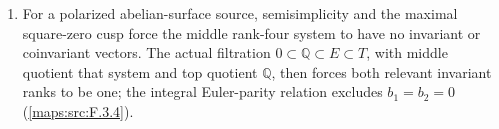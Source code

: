 \begin{enumerate}[label=\arabic*.]
  singular-value bound put a spanning tube in the unpolarized period
  domain.  The verified local-spray approximation theorem, with the
  relative extension-point argument proved here, produces a
  holomorphic transverse period section and retains any prescribed
  bounded cusp jet (\cref{maps:src:F.3.8}, \cref{maps:src:F.3.10}, \cref{maps:src:F.3.11}).
\item For a polarized abelian-surface source, semisimplicity and the
  maximal square-zero cusp force the middle rank-four system to have
  no invariant or coinvariant vectors.  The actual filtration
  $0\subset\mathbb Q\subset E\subset T$, with middle quotient that
  system and top quotient $\mathbb Q$, then forces both relevant
  invariant ranks to be one; the integral Euler-parity relation
  excludes $b_1=b_2=0$ (\cref{maps:src:F.3.4}).
\end{enumerate}

\providecommand{\LL}{\mathcal L}
\providecommand{\cT}{\mathcal T}
\providecommand{\HP}{\mathbb H\mathbb P}
\providecommand{\tr}{\operatorname{tr}}
\providecommand{\sgn}{\operatorname{sgn}}
\providecommand{\vir}{\mathrm{vir}}

